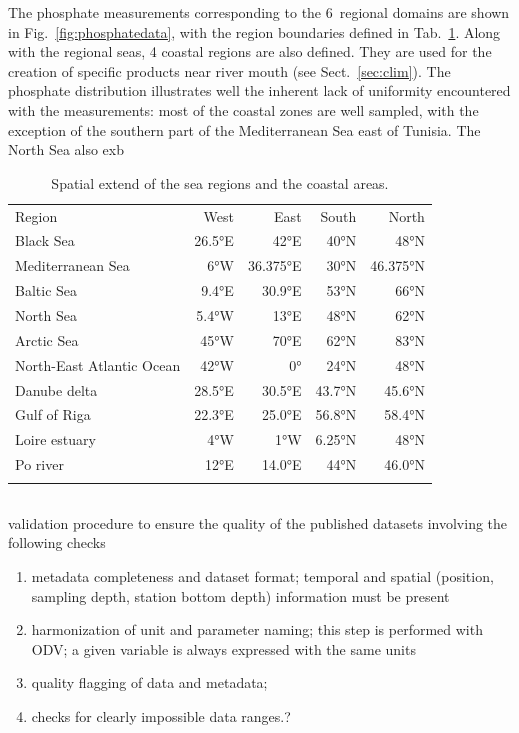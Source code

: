 \documentclass[essd, manuscript]{copernicus}
\begin{document}
The phosphate measurements corresponding to the 6~regional domains are shown in Fig.~\ref{fig:phosphatedata}, with the region boundaries defined in Tab.~\ref{tab:regions}. Along with the regional seas, 4 coastal regions are also defined. They are used for the creation of specific products near river mouth (see Sect.~\ref{sec:clim}). The phosphate distribution illustrates well the inherent lack of uniformity encountered with the measurements: most of the coastal zones are well sampled, with the exception of the southern part of the Mediterranean Sea east of Tunisia. The North Sea also exb 

\begin{table}
\caption{Spatial extend of the sea regions and the coastal areas.\label{tab:regions}}
\begin{tabular}{lrrrr}
\tophline
Region	 					& West		& East		& South 		& North 	 	\\ 
\middlehline	
Black Sea					& 26.5°E 	& 42°E		& 40°N		& 48°N	 	\\
Mediterranean Sea			& 6°W		& 36.375°E	& 30°N		& 46.375°N	\\
Baltic Sea					& 9.4°E		& 30.9°E		& 53°N		& 66°N		\\
North Sea 					& 5.4°W 		& 13°E		& 48°N		& 62°N		\\
Arctic Sea 					& 45°W 		& 70°E		& 62°N		& 83°N		\\
North-East Atlantic Ocean 	& 42°W		& 0° 		& 24°N		& 48°N		\\
\middlehline	
Danube delta					& 28.5°E		& 30.5°E		& 43.7°N 	& 45.6°N		\\
Gulf of Riga 				& 22.3°E 	& 25.0°E 	& 56.8°N 	& 58.4°N		\\
Loire estuary				& 4°W		& 1°W 		& 6.25°N		& 48°N		\\
Po river						& 12°E		& 14.0°E		& 44°N		& 46.0°N		\\
\bottomhline
\end{tabular}
\end{table}


		

\subsection{}

validation procedure to ensure the quality of the published datasets \citep{Barth2015,Lipizer2021}
involving the following checks
\begin{enumerate}
\item metadata completeness and dataset format; temporal and spatial (position, sampling depth, station bottom depth) information
must be present
\item harmonization of unit and parameter naming; this step is performed with ODV; a given variable is always expressed with the same units
\item quality flagging of data and metadata;
\item checks for clearly impossible data ranges.?
\end{enumerate} 
\end{document}
